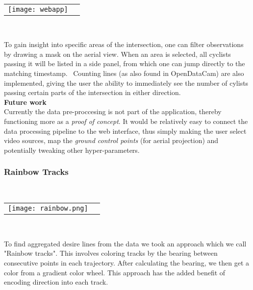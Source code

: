 \ \\ 
\raggedbottom
\begin{tabular}{@{}cc}
\texttt{[image: webapp]} 
\end{tabular}
\label{webapp}
\

To gain insight into specific areas of the intersection, one can filter observations by drawing a mask on the aerial view. 
When an area is selected, all cyclists passing it will be listed in a side panel, from which one can jump directly to the matching timestamp.
\
Counting lines (as also found in OpenDataCam) are also implemented, giving the user the ability to immediately see the number of 
cylists passing certain parts of the intersection in either direction.
\ \\

\textbf{Future work} \\
Currently the data pre-proccesing is not part of the application, thereby functioning more as a \textit{proof of concept}.
It would be relatively easy to connect the data processing pipeline to the web interface, thus simply making the user 
select video sources, map the \textit{ground control points} (for aerial projection) and potentially tweaking other hyper-parameters. 

\subsubsection{Rainbow Tracks}

\ \\ 
\noindent
\begin{tabular}{@{}cc}
\texttt{[image: rainbow.png]} 
\end{tabular}
\label{Rainbow}
\

To find aggregated desire lines from the data we took an approach which we call "Rainbow tracks". 
This involves coloring tracks by the bearing between consecutive points in each trajectory. 
After calculating the bearing, we then get a color from a gradient color wheel. 
This approach has the added benefit of encoding direction into each track.
\ \\ 


